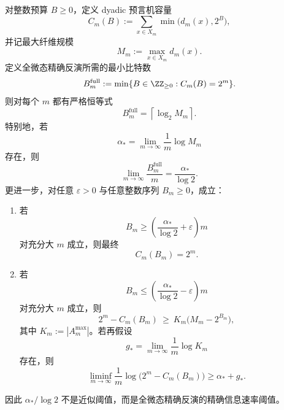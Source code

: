 \begin{theorem}[全微态精确反演的有限层比特阈值与线性速率]\label{thm:xi-full-microstate-exact-inversion-bitrate-threshold}
对整数预算 \(B\ge 0\)，定义 dyadic 预言机容量
\[
C_m(B):=\sum_{x\in X_m}\min\bigl(d_m(x),2^B\bigr),
\]
并记最大纤维规模
\[
M_m:=\max_{x\in X_m}d_m(x).
\]
定义全微态精确反演所需的最小比特数
\[
B_m^{\mathrm{full}}
:=
\min\{B\in\ZZ_{\ge 0}: C_m(B)=2^m\}.
\]
则对每个 \(m\) 都有严格恒等式
\[
\boxed{\;
B_m^{\mathrm{full}}=\left\lceil \log_2 M_m\right\rceil.\;}
\]
特别地，若
\[
\alpha_*=\lim_{m\to\infty}\frac1m\log M_m
\]
存在，则
\[
\boxed{\;
\lim_{m\to\infty}\frac{B_m^{\mathrm{full}}}{m}
=
\frac{\alpha_*}{\log 2}.\;}
\]
更进一步，对任意 \(\varepsilon>0\) 与任意整数序列 \(B_m\ge 0\)，成立：
\begin{enumerate}
  \item 若
  \[
  B_m\ge \left(\frac{\alpha_*}{\log2}+\varepsilon\right)m
  \]
  对充分大 \(m\) 成立，则最终
  \[
  C_m(B_m)=2^m.
  \]
  \item 若
  \[
  B_m\le \left(\frac{\alpha_*}{\log2}-\varepsilon\right)m
  \]
  对充分大 \(m\) 成立，则
  \[
  \boxed{\;
  2^m-C_m(B_m)\ \ge\ K_m\bigl(M_m-2^{B_m}\bigr),\;}
  \]
  其中 \(K_m:=|A_m^{\max}|\)。若再假设
  \[
  g_*=\lim_{m\to\infty}\frac1m\log K_m
  \]
  存在，则
  \[
  \boxed{\;
  \liminf_{m\to\infty}\frac1m\log\bigl(2^m-C_m(B_m)\bigr)
  \ge
  \alpha_*+g_*.\;}
  \]
\end{enumerate}
因此 \(\alpha_*/\log 2\) 不是近似阈值，而是全微态精确反演的精确信息速率阈值。
\end{theorem}
